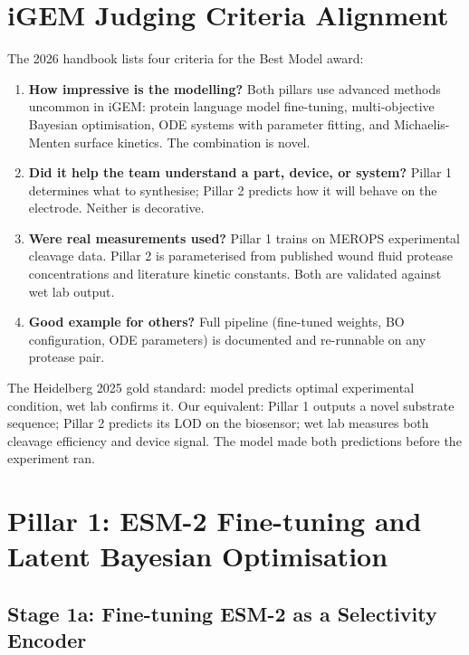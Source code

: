 \documentclass[10pt,a4paper]{article}
\begin{document}
\section{iGEM Judging Criteria Alignment}

The 2026 handbook lists four criteria for the Best Model award:

\begin{enumerate}[topsep=2pt,itemsep=3pt,leftmargin=*]
  \item \textbf{How impressive is the modelling?} Both pillars use
    advanced methods uncommon in iGEM: protein language model fine-tuning,
    multi-objective Bayesian optimisation, ODE systems with parameter fitting,
    and Michaelis-Menten surface kinetics.  The combination is novel.
  \item \textbf{Did it help the team understand a part, device, or system?}
    Pillar 1 determines what to synthesise; Pillar 2 predicts how it
    will behave on the electrode.  Neither is decorative.
  \item \textbf{Were real measurements used?}
    Pillar 1 trains on MEROPS experimental cleavage data.
    Pillar 2 is parameterised from published wound fluid protease concentrations
    and literature kinetic constants.  Both are validated against wet lab output.
  \item \textbf{Good example for others?}
    Full pipeline (fine-tuned weights, BO configuration, ODE parameters) is
    documented and re-runnable on any protease pair.
\end{enumerate}

The Heidelberg 2025 gold standard: model predicts optimal experimental condition,
wet lab confirms it.  Our equivalent: Pillar 1 outputs a novel substrate sequence;
Pillar 2 predicts its LOD on the biosensor; wet lab measures both cleavage
efficiency and device signal.  The model made both predictions before the
experiment ran.

\section{Pillar 1: ESM-2 Fine-tuning and Latent Bayesian Optimisation}

\subsection{Stage 1a: Fine-tuning ESM-2 as a Selectivity Encoder}
\end{document}
